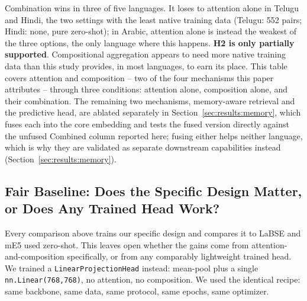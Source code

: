 \documentclass[manuscript]{acmart}
\begin{document}
Combination wins in three of five languages. It loses to attention alone in Telugu and Hindi, the two settings with the least native training data (Telugu: 552 pairs; Hindi: none, pure zero-shot); in Arabic, attention alone is instead the weakest of the three options, the only language where this happens. \textbf{H2 is only partially supported}. Compositional aggregation appears to need more native training data than this study provides, in most languages, to earn its place. This table covers attention and composition -- two of the four mechanisms this paper attributes -- through three conditions: attention alone, composition alone, and their combination. The remaining two mechanisms, memory-aware retrieval and the predictive head, are ablated separately in Section~\ref{sec:results:memory}, which fuses each into the core embedding and tests the fused version directly against the unfused Combined column reported here; fusing either helps neither language, which is why they are validated as separate downstream capabilities instead (Section~\ref{sec:results:memory}).

\subsection{Fair Baseline: Does the Specific Design Matter, or Does Any Trained Head Work?}
\label{sec:results:baseline-head}

Every comparison above trains our specific design and compares it to LaBSE and mE5 used zero-shot. This leaves open whether the gains come from attention-and-composition specifically, or from any comparably lightweight trained head. We trained a \texttt{LinearProjectionHead} instead: mean-pool plus a single \texttt{nn.Linear(768,768)}, no attention, no composition. We used the identical recipe: same backbone, same data, same protocol, same epochs, same optimizer.
\end{document}
